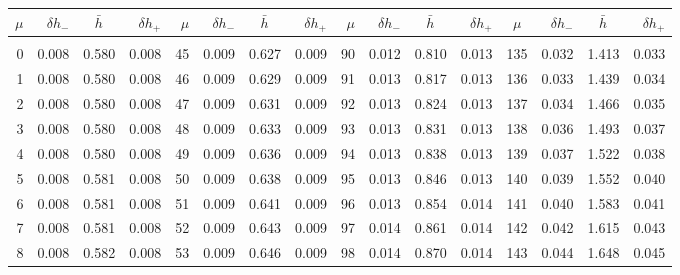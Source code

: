\newpage
\begin{table}\centering
\small{ \begin{tabular}{rrrr|rrrr|rrrr|crrr}
$\mu$ & $\delta h_-$  & $\bar{h}~~~~$ & $\delta h_+$ &
$\mu$ & $\delta h_-$  & $\bar{h}~~~~$ & $\delta h_+$ &
$\mu$ & $\delta h_-$  & $\bar{h}~~~~$ & $\delta h_+$ &
$\mu$ & $\delta h_-$  & $\bar{h}~~~~$ & $\delta h_+$ \\\hline
&&&&&&&&&&&&&&&\\[-1.75ex]
  0 & \tiny{  0.008} &   0.580 & \tiny{  0.008} &  45 & \tiny{  0.009} &   0.627 & \tiny{  0.009} &  90 & \tiny{  0.012} &   0.810 & \tiny{  0.013} & 135 & \tiny{  0.032} &   1.413 & \tiny{  0.033}\\
  1 & \tiny{  0.008} &   0.580 & \tiny{  0.008} &  46 & \tiny{  0.009} &   0.629 & \tiny{  0.009} &  91 & \tiny{  0.013} &   0.817 & \tiny{  0.013} & 136 & \tiny{  0.033} &   1.439 & \tiny{  0.034}\\
  2 & \tiny{  0.008} &   0.580 & \tiny{  0.008} &  47 & \tiny{  0.009} &   0.631 & \tiny{  0.009} &  92 & \tiny{  0.013} &   0.824 & \tiny{  0.013} & 137 & \tiny{  0.034} &   1.466 & \tiny{  0.035}\\
  3 & \tiny{  0.008} &   0.580 & \tiny{  0.008} &  48 & \tiny{  0.009} &   0.633 & \tiny{  0.009} &  93 & \tiny{  0.013} &   0.831 & \tiny{  0.013} & 138 & \tiny{  0.036} &   1.493 & \tiny{  0.037}\\
  4 & \tiny{  0.008} &   0.580 & \tiny{  0.008} &  49 & \tiny{  0.009} &   0.636 & \tiny{  0.009} &  94 & \tiny{  0.013} &   0.838 & \tiny{  0.013} & 139 & \tiny{  0.037} &   1.522 & \tiny{  0.038}\\
  5 & \tiny{  0.008} &   0.581 & \tiny{  0.008} &  50 & \tiny{  0.009} &   0.638 & \tiny{  0.009} &  95 & \tiny{  0.013} &   0.846 & \tiny{  0.013} & 140 & \tiny{  0.039} &   1.552 & \tiny{  0.040}\\
  6 & \tiny{  0.008} &   0.581 & \tiny{  0.008} &  51 & \tiny{  0.009} &   0.641 & \tiny{  0.009} &  96 & \tiny{  0.013} &   0.854 & \tiny{  0.014} & 141 & \tiny{  0.040} &   1.583 & \tiny{  0.041}\\
  7 & \tiny{  0.008} &   0.581 & \tiny{  0.008} &  52 & \tiny{  0.009} &   0.643 & \tiny{  0.009} &  97 & \tiny{  0.014} &   0.861 & \tiny{  0.014} & 142 & \tiny{  0.042} &   1.615 & \tiny{  0.043}\\
  8 & \tiny{  0.008} &   0.582 & \tiny{  0.008} &  53 & \tiny{  0.009} &   0.646 & \tiny{  0.009} &  98 & \tiny{  0.014} &   0.870 & \tiny{  0.014} & 143 & \tiny{  0.044} &   1.648 & \tiny{  0.045}\\

\end{tabular}}
\end{table}
